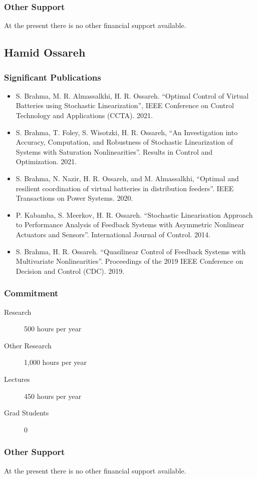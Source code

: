 \subsubsection{Other Support}
At the present there is no other financial support available.

\subsection{Hamid Ossareh}
%
\subsubsection{Significant Publications}

\begin{itemize}
\item S. Brahma, M. R. Almassalkhi, H. R. Ossareh. ``Optimal Control
  of Virtual Batteries using Stochastic Linearization'', IEEE
  Conference on Control Technology and Applications (CCTA). 2021.
\item S. Brahma, T. Foley, S. Wisotzki, H. R. Ossareh, ``An
  Investigation into Accuracy, Computation, and Robustness of
  Stochastic Linearization of Systems with Saturation
  Nonlinearities''. Results in Control and Optimization. 2021.
\item S. Brahma, N. Nazir, H. R. Ossareh, and M. Almassalkhi,
  ``Optimal and resilient coordination of virtual batteries in
  distribution feeders''. IEEE Transactions on Power Systems. 2020.
\item P. Kabamba, S. Meerkov, H. R. Ossareh. ``Stochastic
  Linearisation Approach to Performance Analysis of Feedback Systems
  with Asymmetric Nonlinear Actuators and Sensors''. International
  Journal of Control. 2014.
\item S. Brahma, H. R. Ossareh. ``Quasilinear Control of Feedback
  Systems with Multivariate Nonlinearities''. Proceedings of the 2019
  IEEE Conference on Decision and Control (CDC). 2019.
\end{itemize}

\subsubsection{Commitment}
\begin{description}
\item[Research] 500 hours per year
\item[Other Research] 1,000 hours per year
\item[Lectures]  450 hours per year
\item[Grad Students] 0
\end{description}

\subsubsection{Other Support}
At the present there is no other financial support available.


